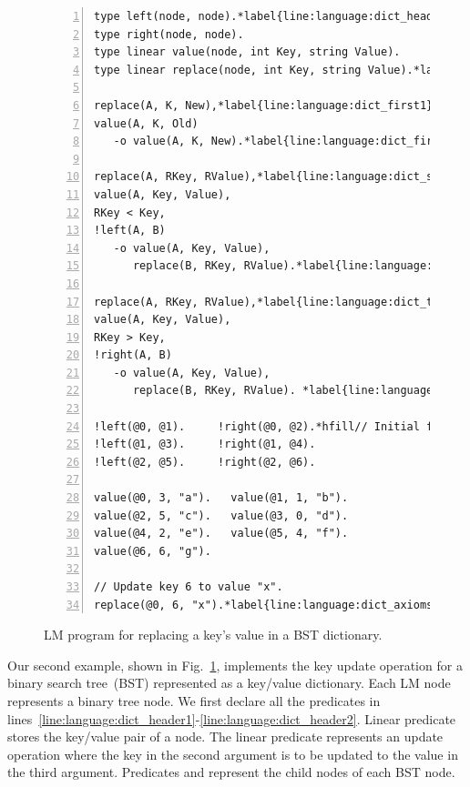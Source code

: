 
\begin{figure}[ht]
\begin{Verbatim}[numbers=left,fontsize=\codesize,commandchars=\*\{\}]
type left(node, node).*label{line:language:dict_header1}*hfill // Predicate declaration.
type right(node, node).
type linear value(node, int Key, string Value).
type linear replace(node, int Key, string Value).*label{line:language:dict_header2}

replace(A, K, New),*label{line:language:dict_first1}*hfill// Rule 1: we found our key.
value(A, K, Old)
   -o value(A, K, New).*label{line:language:dict_first2}

replace(A, RKey, RValue),*label{line:language:dict_second1}*hfill// Rule 2: go left.
value(A, Key, Value),
RKey < Key,
!left(A, B)
   -o value(A, Key, Value),
      replace(B, RKey, RValue).*label{line:language:dict_second2}

replace(A, RKey, RValue),*label{line:language:dict_third1}*hfill// Rule 3: go right.
value(A, Key, Value),
RKey > Key,
!right(A, B)
   -o value(A, Key, Value),
      replace(B, RKey, RValue). *label{line:language:dict_third2}

!left(@0, @1).     !right(@0, @2).*hfill// Initial facts.*label{line:language:dict_axioms1}
!left(@1, @3).     !right(@1, @4). 
!left(@2, @5).     !right(@2, @6).

value(@0, 3, "a").   value(@1, 1, "b").
value(@2, 5, "c").   value(@3, 0, "d").
value(@4, 2, "e").   value(@5, 4, "f").
value(@6, 6, "g").

// Update key 6 to value "x".
replace(@0, 6, "x").*label{line:language:dict_axioms2}
\end{Verbatim}
\caption{LM program for replacing a key's value in a BST dictionary.}
\label{code:language:btree_replace}
\end{figure}

Our second example, shown in Fig.~\ref{code:language:btree_replace}, implements
the key update operation for a binary search tree~(BST) represented as a
key/value dictionary. Each LM node represents a binary tree node. We first
declare all the predicates in
lines~\ref{line:language:dict_header1}-\ref{line:language:dict_header2}.  Linear
predicate  stores the key/value pair of a node. The linear predicate
 represents an update operation where the key in the second
argument is to be updated to the value in the third argument. Predicates
 and  represent the child nodes of each BST node.

